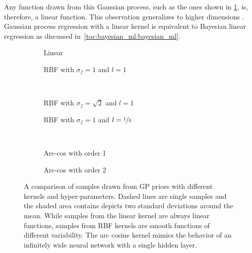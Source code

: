 Any function drawn from this Gaussian process, such as the ones shown in \cref{fig:gp:gp_samples:linear}, is, therefore, a linear function.
This observation generalizes to higher dimensions \cite{rasmussen_gaussian_2006}.
Gaussian process regression with a linear kernel is equivalent to Bayesian linear regression as discussed in~\cref{toc:bayesian_ml:bayesian_ml}.
\begin{figure}[p]
    \begin{subfigure}[b]{\halffigurewidth}
        \centering
        \caption{
            Linear
            \label{fig:gp:gp_samples:linear}
        }
    \end{subfigure}
    \hfill
    \begin{subfigure}[b]{\halffigurewidth}
        \centering
        \caption{
            RBF with $\sigma_f = 1$ and $l=1$
            \label{fig:gp:gp_samples:rbf_normal}
        }
    \end{subfigure}\\[\figureskip]
    \begin{subfigure}[b]{\halffigurewidth}
        \centering
        \caption{
            RBF with $\sigma_f = \sqrt{2}$ and $l=1$
            \label{fig:gp:gp_samples:rbf_noisy}
        }
    \end{subfigure}
    \hfill
    \begin{subfigure}[b]{\halffigurewidth}
        \centering
        \caption{
            RBF with $\sigma_f = 1$ and $l = \sfrac{1}{4}$
            \label{fig:gp:gp_samples:rbf_lengthscale}
        }
    \end{subfigure}\\[\figureskip]
    \begin{subfigure}[b]{\halffigurewidth}
        \centering
        \caption{
            Arc-cos with order 1
            \label{fig:gp:gp_samples:arccos:1}
        }
    \end{subfigure}
    \hfill
    \begin{subfigure}[b]{\halffigurewidth}
        \centering
        \caption{
            Arc-cos with order 2
            \label{fig:gp:gp_samples:arccos:2}
        }
    \end{subfigure}
    \caption[Samples from GP priors]{
        \label{fig:gp:gp_samples}
        A comparison of samples drawn from GP priors with different kernels and hyper-parameters.
        Dashed lines are single samples and the shaded area contains depicts two standard deviations around the mean.
        While samples from the linear kernel are always linear functions, samples from RBF kernels are smooth functions of different variability.
        The arc cosine kernel mimics the behavior of an infinitely wide neural network with a single hidden layer.
    }
\end{figure}

